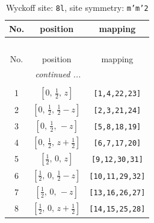 \documentclass[fleqn,8pt]{jsarticle}
\begin{document}
\begin{longtable}{ccc}
\caption{Wyckoff site: {\tt 8l}, site symmetry: {\tt m'm'2}}
 \\
 \hline \hline
No. & position & mapping \\ \hline \endfirsthead

\multicolumn{2}{l}{\tablename\ \thetable{}} \\
 \hline \hline
No. & position & mapping \\ \hline \endhead

 \hline \hline
\multicolumn{2}{r}{\footnotesize\it continued ...} \\ \endfoot

 \hline \hline
\multicolumn{2}{r}{} \\ \endlastfoot

1 & $\left[ 0,\, \frac{1}{2},\, z \right]$ & {\tt [1,4,22,23]} \\ \hline
2 & $\left[ 0,\, \frac{1}{2},\, \frac{1}{2} - z \right]$ & {\tt [2,3,21,24]} \\ \hline
3 & $\left[ 0,\, \frac{1}{2},\, - z \right]$ & {\tt [5,8,18,19]} \\ \hline
4 & $\left[ 0,\, \frac{1}{2},\, z + \frac{1}{2} \right]$ & {\tt [6,7,17,20]} \\ \hline
5 & $\left[ \frac{1}{2},\, 0,\, z \right]$ & {\tt [9,12,30,31]} \\ \hline
6 & $\left[ \frac{1}{2},\, 0,\, \frac{1}{2} - z \right]$ & {\tt [10,11,29,32]} \\ \hline
7 & $\left[ \frac{1}{2},\, 0,\, - z \right]$ & {\tt [13,16,26,27]} \\ \hline
8 & $\left[ \frac{1}{2},\, 0,\, z + \frac{1}{2} \right]$ & {\tt [14,15,25,28]} \\
\end{longtable}
\renewcommand{\arraystretch}{1.2}
\end{document}
